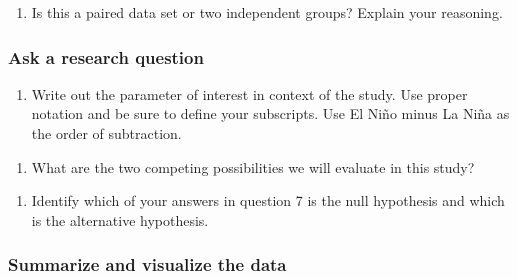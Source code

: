\documentclass[
]{report}
\providecommand{\tightlist}{%
  \setlength{\itemsep}{0pt}\setlength{\parskip}{0pt}}
\newcommand\latexcode[1]{#1}
\begin{document}
\vspace{1in}

\begin{enumerate}
\def\labelenumi{\arabic{enumi}.}
\setcounter{enumi}{4}
\tightlist
\item
  Is this a paired data set or two independent groups? Explain your reasoning.
\end{enumerate}

\vspace{1in}

\hypertarget{ask-a-research-question-3}{%
\subsubsection*{Ask a research question}\label{ask-a-research-question-3}}

\begin{enumerate}
\def\labelenumi{\arabic{enumi}.}
\setcounter{enumi}{5}
\tightlist
\item
  Write out the parameter of interest in context of the study. Use proper notation and be sure to define your subscripts. Use El Ni\latexcode{\~{n}}o minus La Ni\latexcode{\~{n}}a as the order of subtraction.
\end{enumerate}

\vspace{1in}

\begin{enumerate}
\def\labelenumi{\arabic{enumi}.}
\setcounter{enumi}{6}
\tightlist
\item
  What are the two competing possibilities we will evaluate in this study?
\end{enumerate}

\vspace{1in}

\begin{enumerate}
\def\labelenumi{\arabic{enumi}.}
\setcounter{enumi}{7}
\tightlist
\item
  Identify which of your answers in question 7 is the null hypothesis and which is the alternative hypothesis.
\end{enumerate}

\vspace{1in}

\hypertarget{summarize-and-visualize-the-data-3}{%
\subsubsection*{Summarize and visualize the data}\label{summarize-and-visualize-the-data-3}}
\end{document}
